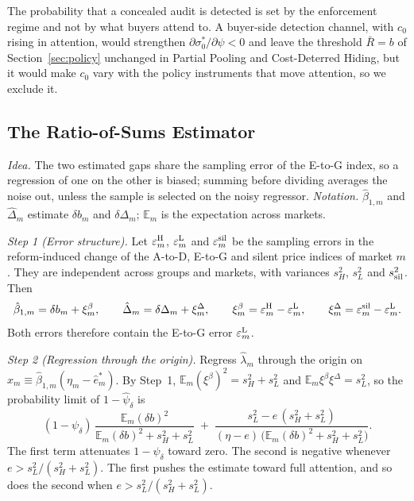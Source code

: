 The probability that a concealed audit is detected is set by the enforcement regime and not by what buyers attend to. A buyer-side detection channel, with $c_0$ rising in attention, would strengthen $\partial\sigma_0^*/\partial\psi<0$ and leave the threshold $\bar R=b$ of Section~\ref{sec:policy} unchanged in Partial Pooling and Cost-Deterred Hiding, but it would make $c_0$ vary with the policy instruments that move attention, so we exclude it.


\subsection*{The Ratio-of-Sums Estimator}
\label{app:att_estimator}

\noindent\emph{Idea.} The two estimated gaps share the sampling error of the E-to-G index, so a regression of one on the other is biased; summing before dividing averages the noise out, unless the sample is selected on the noisy regressor. \emph{Notation.} $\hat\beta_{1,m}$ and $\hat\Delta_m$ estimate $\delta b_m$ and $\delta\Delta_m$; $\mathbb E_m$ is the expectation across markets.

\emph{Step 1 (Error structure).} Let $\varepsilon^{\rm H}_m$, $\varepsilon^{\rm L}_m$ and $\varepsilon^{\rm sil}_m$ be the sampling errors in the reform-induced change of the A-to-D, E-to-G and silent price indices of market $m$. They are independent across groups and markets, with variances $s_H^2$, $s_L^2$ and $s_{\rm sil}^2$. Then
\begin{equation*}
    \hat\beta_{1,m}=\delta b_m+\xi^{\beta}_m,\qquad \hat\Delta_m=\delta\Delta_m+\xi^{\Delta}_m,\qquad \xi^{\beta}_m=\varepsilon^{\rm H}_m-\varepsilon^{\rm L}_m,\qquad \xi^{\Delta}_m=\varepsilon^{\rm sil}_m-\varepsilon^{\rm L}_m.
\end{equation*}
Both errors therefore contain the E-to-G error $\varepsilon^{\rm L}_m$.

\emph{Step 2 (Regression through the origin).} Regress $\hat\lambda_m$ through the origin on $x_m\equiv\hat\beta_{1,m}(\eta_m-\hat e^*_m)$. By Step~1, $\mathbb E_m(\xi^\beta)^2=s_H^2+s_L^2$ and $\mathbb E_m\xi^\beta\xi^\Delta=s_L^2$, so the probability limit of $1-\hat\psi_\delta$ is
\begin{equation*}
    (1-\psi_\delta)\,\frac{\mathbb E_m(\delta b)^2}{\mathbb E_m(\delta b)^2+s_H^2+s_L^2}\;+\;\frac{s_L^2-e\,(s_H^2+s_L^2)}{(\eta-e)\,\big(\mathbb E_m(\delta b)^2+s_H^2+s_L^2\big)}.
\end{equation*}
The first term attenuates $1-\psi_\delta$ toward zero. The second is negative whenever $e>s_L^2/(s_H^2+s_L^2)$. The first pushes the estimate toward full attention, and so does the second when $e>s_L^2/(s_H^2+s_L^2)$.

